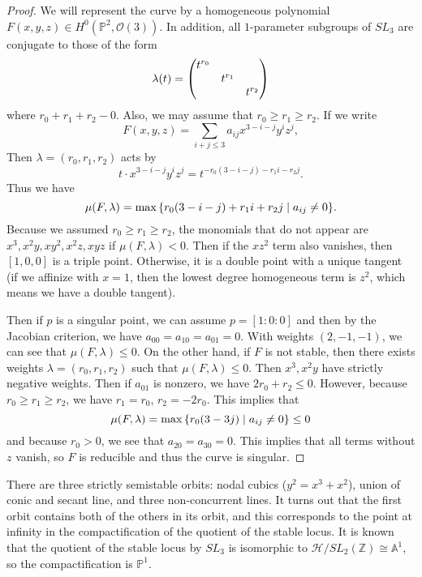 \documentclass[leqno, openany]{memoir}
\theoremstyle{definition}
\theoremstyle{remark}
\theoremstyle{plain}
\theoremstyle{definition}
\theoremstyle{remark}
\newcommand{\A}{\mathbb{A}}
\newcommand{\Z}{\mathbb{Z}}
\renewcommand{\P}{\mathbb{P}}
\newcommand{\mc}[1]{\mathcal{#1}}
\begin{document}
\begin{proof}
    We will represent the curve by a homogeneous polynomial $F(x,y,z) \in H^0(\P^2, \mc{O}(3))$. In addition, all $1$-parameter subgroups of $SL_3$ are conjugate to those of the form
    \[ \lambda(t) = \mqty(\dmat{t^{r_0}, t^{r_1}, t^{r_2}}) \]
    where $r_0 + r_1 + r_2 - 0$. Also, we may assume that $r_0 \geq r_1 \geq r_2$. If we write 
    \[ F(x,y,z) = \sum_{i+j \leq 3} a_{ij} x^{3-i-j} y^i z^j, \]
    Then $\lambda = (r_0, r_1, r_2)$ acts by
    \[ t \cdot x^{3-i-j} y^i z^j = t^{-r_0(3-i-j) - r_1 i - r_2 j}. \]
    Thus we have
    \[ \mu(F, \lambda) = \max \qty{ r_0(3-i-j) + r_1 i + r_2 j \mid a_{ij} \neq 0 }. \]
    Because we assumed $r_0 \geq r_1 \geq r_2$, the monomials that do not appear are $x^3, x^2 y, xy^2, x^2 z, xyz$ if $\mu(F, \lambda) < 0$. Then if the $xz^2$ term also vanishes, then $[1,0,0]$ is a triple point. Otherwise, it is a double point with a unique tangent (if we affinize with $x = 1$, then the lowest degree homogeneous term is $z^2$, which means we have a double tangent).

    Then if $p$ is a singular point, we can assume $p = [1:0:0]$ and then by the Jacobian criterion, we have $a_{00} = a_{10} = a_{01} = 0$. With weights $(2,-1,-1)$, we can see that $\mu(F, \lambda) \leq 0$. On the other hand, if $F$ is not stable, then there exists weights $\lambda = (r_0, r_1, r_2)$ such that $\mu(F, \lambda) \leq 0$. Then $x^3, x^2y$ have strictly negative weights. Then if $a_{01}$ is nonzero, we have $2r_0 + r_2 \leq 0$. However, because $r_0 \geq r_1 \geq r_2$, we have $r_1 = r_0$, $r_2 = -2r_0$. This implies that
    \[ \mu(F, \lambda) = \max \qty{r_0(3-3j) \mid a_{ij} \neq 0} \leq 0 \]
    and because $r_0 > 0$, we see that $a_{20} = a_{30} = 0$. This implies that all terms without $z$ vanish, so $F$ is reducible and thus the curve is singular.
\end{proof}

There are three strictly semistable orbits: nodal cubics ($y^2 = x^3 + x^2$), union of conic and secant line, and three non-concurrent lines. It turns out that the first orbit contains both of the others in its orbit, and this corresponds to the point at infinity in the compactification of the quotient of the stable locus. It is known that the quotient of the stable locus by $SL_3$ is isomorphic to $\mc{H} / SL_2(\Z) \cong \A^1$, so the compactification is $\P^1$.
\end{document}
